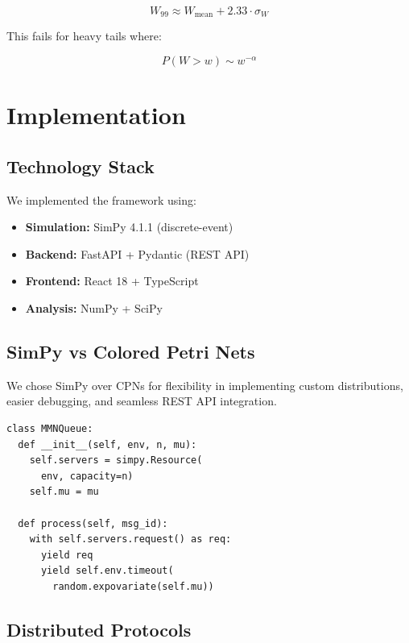 \documentclass[conference,twocolumn]{IEEEtran}
\begin{document}
\begin{equation}
W_{99} \approx W_{\text{mean}} + 2.33 \cdot \sigma_W
\end{equation}

This fails for heavy tails where:

\begin{equation}
P(W > w) \sim w^{-\alpha}
\end{equation}

\section{Implementation}

\subsection{Technology Stack}

We implemented the framework using:
\begin{itemize}[leftmargin=*]
    \item \textbf{Simulation:} SimPy 4.1.1 (discrete-event)
    \item \textbf{Backend:} FastAPI + Pydantic (REST API)
    \item \textbf{Frontend:} React 18 + TypeScript
    \item \textbf{Analysis:} NumPy + SciPy
\end{itemize}

\subsection{SimPy vs Colored Petri Nets}

We chose SimPy over CPNs for flexibility in implementing custom distributions, easier debugging, and seamless REST API integration.

\begin{lstlisting}[style=python, caption={M/M/N Queue Implementation}]
class MMNQueue:
  def __init__(self, env, n, mu):
    self.servers = simpy.Resource(
      env, capacity=n)
    self.mu = mu
    
  def process(self, msg_id):
    with self.servers.request() as req:
      yield req
      yield self.env.timeout(
        random.expovariate(self.mu))
\end{lstlisting}

\subsection{Distributed Protocols}
\end{document}
